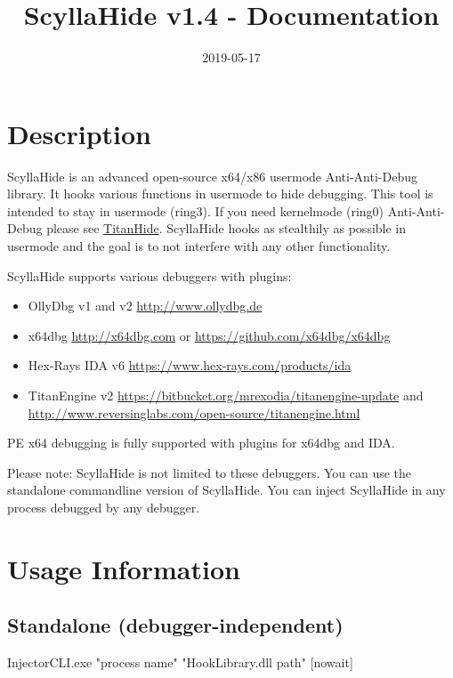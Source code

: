 \documentclass[10pt,a4paper]{article}
\title{ScyllaHide v1.4 - Documentation}
\author{}
\date{2019-05-17}
\begin{document}
\maketitle
 
\tableofcontents
\listoffigures
\lstlistoflistings

\newpage
{}

\section{Description}

ScyllaHide is an advanced open-source x64/x86 usermode Anti-Anti-Debug library. It hooks various functions in usermode to hide debugging. This tool is intended to stay in usermode (ring3). If you need kernelmode (ring0) Anti-Anti-Debug please see \href{https://github.com/mrexodia/TitanHide}{TitanHide}. ScyllaHide hooks as stealthily as possible in usermode and the goal is to not interfere with any other functionality.

ScyllaHide supports various debuggers with plugins:
\begin{itemize}
\item OllyDbg v1 and v2 \url{http://www.ollydbg.de}
\item x64dbg \url{http://x64dbg.com} or \url{https://github.com/x64dbg/x64dbg}
\item Hex-Rays IDA v6 \url{https://www.hex-rays.com/products/ida}
\item TitanEngine v2 \url{https://bitbucket.org/mrexodia/titanengine-update} and \url{http://www.reversinglabs.com/open-source/titanengine.html}
\end{itemize}

PE x64 debugging is fully supported with plugins for x64dbg and IDA.

Please note: ScyllaHide is not limited to these debuggers. You can use the standalone commandline version of ScyllaHide. You can inject ScyllaHide in any process debugged by any debugger.

\section{Usage Information}
\subsection{Standalone (debugger-independent)}
InjectorCLI.exe "process name" "HookLibrary.dll path" [nowait]
\end{document}
